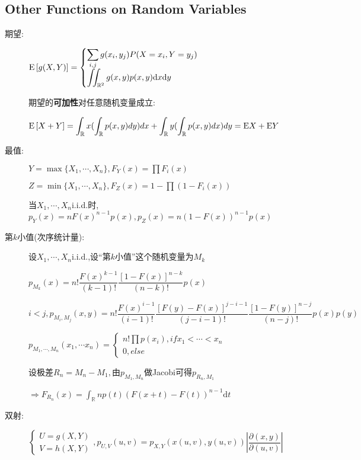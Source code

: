 \begin{enumerate}
\end{enumerate}

\subsection{Other Functions on Random Variables}
\begin{description}
  \item[期望:]
    $ \E{g(X,Y)}=\begin{cases}\sum_{i,j}g(x_i,y_j)P(X=x_i,Y=y_j)\\\iint_{\mathbb{R}^2}g(x,y)p(x,y)\mathrm{d}x\mathrm{d}y \end{cases}$

    期望的\textbf{可加性}对任意随机变量成立:

    $
    \E{X+Y}=\int_{\mathbb{R}}x(\int_{\mathbb{R}}p(x,y)dy)dx+\int_{\mathbb{R}}y(\int_{\mathbb{R}}p(x,y)dx)dy
    = \Ex{X}+\Ex{Y}$

  \item[最值:]
    $ Y=\max\{ X_1,\cdots, X_n\}, F_Y(x) = \prod{F_i(x)}$

    $ Z = \min\{ X_1,\cdots ,X_n\}, F_Z(x) = 1-\prod{(1-F_i(x))}$

    当$ X_1,\cdots ,X_n$i.i.d.时,$ p_Y(x)=nF(x)^{n-1}p(x), p_Z(x)=n(1-F(x))^{n-1}p(x)$
  \item[第$ k$小值(次序统计量):]设$ X_1,\cdots ,X_n$i.i.d.,设``第$ k$小值''这个随机变量为$ M_k$

      $ p_{M_k}(x)=n!\dfrac{F(x)^{k-1}}{(k-1)!}\dfrac{[1-F(x)]^{n-k}}{(n-k)!}p(x)$

      $i<j, p_{M_i,M_j}(x,y)=n!\dfrac{F(x)^{i-1}}{(i-1)!}\dfrac{[F(y)-F(x)]^{j-i-1}}{(j-i-1)!}\dfrac{[1-F(y)]^{n-j}}{(n-j)!}p(x)p(y)$

      $ p_{M_1,\cdots ,M_n}(x_1,\cdots x_n)=\begin{cases}n!\prod{p(x_i)},if x_1<\cdots <x_n\\0,else \end{cases}$

      设极差$ R_n = M_n - M_1, $由$ p_{M_1,M_n}$做Jacobi可得$ p_{R_n,M_1}$

      $\Rightarrow F_{R_n}(x) = \int_{\mathbb{R}}np(t)(F(x+t)-F(t))^{n-1}\mathrm{d}t $
  \item[双射:]
   $ \begin{cases}U=g(X,Y)\\V=h(X,Y)\end{cases},p_{U,V}(u,v) = p_{X,Y}(x(u,v),y(u,v))|\dfrac{\partial(x,y)}{\partial(u,v)}|$


\end{description}

